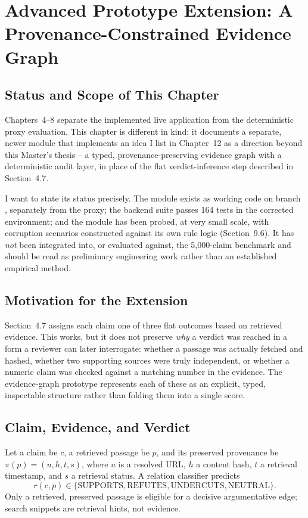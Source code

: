 \documentclass[12pt,a4paper,openany]{report}
\begin{document}
\chapter{Advanced Prototype Extension: A Provenance-Constrained Evidence Graph}
\label{ch:advanced}
\section{Status and Scope of This Chapter}
Chapters~4--8 separate the implemented live application from the deterministic proxy evaluation. This chapter is different in kind: it documents a separate, newer module that implements an idea I list in Chapter~12 as a direction beyond this Master's thesis -- a typed, provenance-preserving evidence graph with a deterministic audit layer, in place of the flat verdict-inference step described in Section~4.7.

I want to state its status precisely. The module exists as working code on
branch , separately from the proxy;
the backend suite passes 164 tests in the corrected environment; and the module
has been probed, at very small scale, with corruption scenarios constructed
against its own rule logic (Section~9.6). It has \emph{not} been integrated
into, or evaluated against, the 5{,}000-claim benchmark and should be read as
preliminary engineering work rather than an established empirical method.

\section{Motivation for the Extension}
Section~4.7 assigns each claim one of three flat outcomes based on retrieved evidence. This works, but it does not preserve \emph{why} a verdict was reached in a form a reviewer can later interrogate: whether a passage was actually fetched and hashed, whether two supporting sources were truly independent, or whether a numeric claim was checked against a matching number in the evidence. The evidence-graph prototype represents each of these as an explicit, typed, inspectable structure rather than folding them into a single score.

\section{Claim, Evidence, and Verdict}
Let a claim be $c$, a retrieved passage be $p$, and its preserved provenance be $\pi(p) = (u, h, t, s)$, where $u$ is a resolved URL, $h$ a content hash, $t$ a retrieval timestamp, and $s$ a retrieval status. A relation classifier predicts
\[
r(c,p) \in \{\mathrm{SUPPORTS}, \mathrm{REFUTES}, \mathrm{UNDERCUTS}, \mathrm{NEUTRAL}\}.
\]
Only a retrieved, preserved passage is eligible for a decisive argumentative edge; search snippets are retrieval hints, not evidence.
\end{document}
